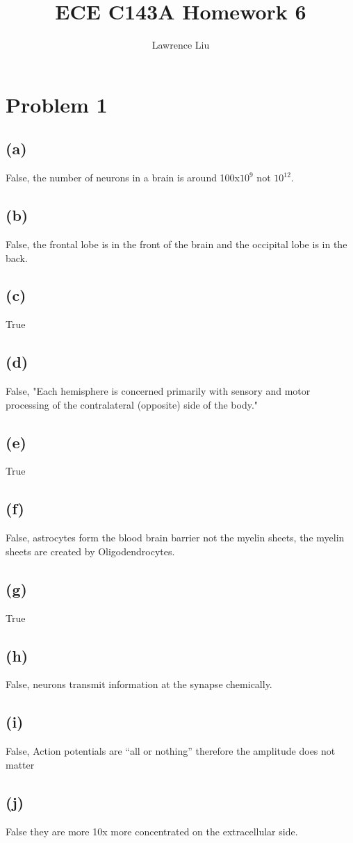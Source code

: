 \documentclass[12pt]{article}
\title{ECE C143A Homework 6}
\author{Lawrence Liu}
\begin{document}
\maketitle
\section*{Problem 1}
\subsection*{(a)}
False, the number of neurons in a brain is around 100x$10^9$ not $10^{12}$.
\subsection*{(b)}
False, the frontal lobe is in the front of the brain and the occipital lobe is in the back. 
\subsection*{(c)}
True
\subsection*{(d)}
False, "Each hemisphere is concerned primarily with sensory and motor processing of the contralateral (opposite) side of the body."
\subsection*{(e)}
True
\subsection*{(f)}
False, astrocytes form the blood brain barrier not the myelin sheets, the myelin sheets are created by Oligodendrocytes.
\subsection*{(g)}
True
\subsection*{(h)}
False,  neurons transmit information at the synapse chemically.

\subsection*{(i)}
False, Action potentials are “all or nothing” therefore the amplitude does not matter
\subsection*{(j)}
False they are more 10x more concentrated on the extracellular side.
\end{document}
